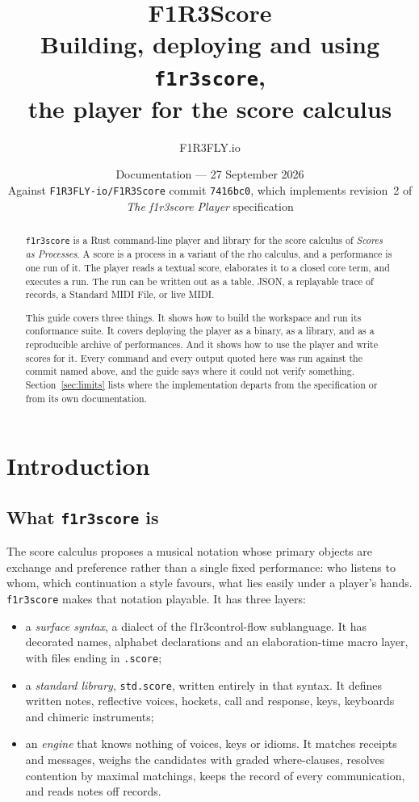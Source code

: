\documentclass[11pt,a4paper]{article}
\title{\bfseries F1R3Score\\[4pt]
\large Building, deploying and using \texttt{f1r3score},\\
the player for the score calculus}
\author{F1R3FLY.io}
\date{Documentation --- 27 September 2026\\[2pt]
\normalsize Against \texttt{F1R3FLY-io/F1R3Score} commit \texttt{7416bc0},
which implements revision~2 of \emph{The f1r3score Player} specification}
\newcommand{\rhoc}{\textsf{rho}}
\newcommand{\tool}{\texttt{f1r3score}}
\newcommand{\ttx}[1]{\texttt{#1}}
\begin{document}
\maketitle

\begin{abstract}
\noindent \tool{} is a Rust command-line player and library for the score
calculus of \emph{Scores as Processes}. A score is a process in a variant of
the \rhoc{} calculus, and a performance is one run of it. The player reads a
textual score, elaborates it to a closed core term, and executes a run. The
run can be written out as a table, JSON, a replayable trace of records, a
Standard MIDI File, or live MIDI.

This guide covers three things. It shows how to build the workspace and run its
conformance suite. It covers deploying the player as a binary, as a library, and
as a reproducible archive of performances. And it shows how to use the player
and write scores for it. Every command and every output quoted here was run
against the commit named above, and the guide says where it could not verify
something. Section~\ref{sec:limits} lists where the implementation departs from
the specification or from its own documentation.
\end{abstract}

\tableofcontents
\newpage

\section{Introduction}\label{sec:intro}

\subsection{What \tool{} is}

The score calculus proposes a musical notation whose primary objects are
exchange and preference rather than a single fixed performance: who listens to
whom, which continuation a style favours, what lies easily under a player's
hands. \tool{} makes that notation playable. It has three layers:
\begin{itemize}
\item a \emph{surface syntax}, a dialect of the f1r3\textbar@ng control-flow
  sublanguage. It has decorated names, alphabet declarations and an
  elaboration-time macro layer, with files ending in \ttx{.score};
\item a \emph{standard library}, \ttx{std.score}, written entirely in that
  syntax. It defines written notes, reflective voices, hockets, call and
  response, keys, keyboards and chimeric instruments;
\item an \emph{engine} that knows nothing of voices, keys or idioms. It
  matches receipts and messages, weighs the candidates with graded
  where-clauses, resolves contention by maximal matchings, keeps the record of
  every communication, and reads notes off records.
\end{itemize}
\end{document}
